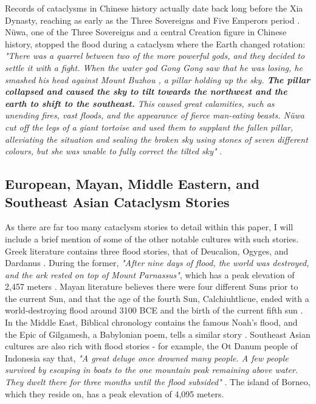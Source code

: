 \documentclass[10pt,twocolumn,letterpaper]{article}
\begin{document}
Records of cataclysms in Chinese history actually date back long before the Xia Dynasty, reaching as early as the Three Sovereigns and Five Emperors period \cite{7}. Nüwa, one of the Three Sovereigns and a central Creation figure in Chinese history, stopped the flood during a cataclysm where the Earth changed rotation: \textit{"There was a quarrel between two of the more powerful gods, and they decided to settle it with a fight. When the water god Gong Gong saw that he was losing, he smashed his head against Mount Buzhou , a pillar holding up the sky. \textbf{The pillar collapsed and caused the sky to tilt towards the northwest and the earth to shift to the southeast.} This caused great calamities, such as unending fires, vast floods, and the appearance of fierce man-eating beasts. Nüwa cut off the legs of a giant tortoise and used them to supplant the fallen pillar, alleviating the situation and sealing the broken sky using stones of seven different colours, but she was unable to fully correct the tilted sky"} \cite{8}.

\subsection{European, Mayan, Middle Eastern, and Southeast Asian Cataclysm Stories}

As there are far too many cataclysm stories to detail within this paper, I will include a brief mention of some of the other notable cultures with such stories. Greek literature contains three flood stories, that of Deucalion, Ogyges, and Dardanus \cite{9,10}. During the former, \textit{"After nine days of flood, the world was destroyed, and the ark rested on top of Mount Parnassus"}, which has a peak elevation of 2,457 meters \cite{11}. Mayan literature believes there were four different Suns prior to the current Sun, and that the age of the fourth Sun, Calchiuhtlicue, ended with a world-destroying flood around 3100 BCE and the birth of the current fifth sun \cite{12}. In the Middle East, Biblical chronology contains the famous Noah's flood, and the Epic of Gilgamesh, a Babylonian poem, tells a similar story \cite{13}. Southeast Asian cultures are also rich with flood stories - for example, the Ot Danum people of Indonesia say that, \textit{"A great deluge once drowned many people. A few people survived by escaping in boats to the one mountain peak remaining above water. They dwelt there for three months until the flood subsided"} \cite{3}. The island of Borneo, which they reside on, has a peak elevation of 4,095 meters.
\end{document}
